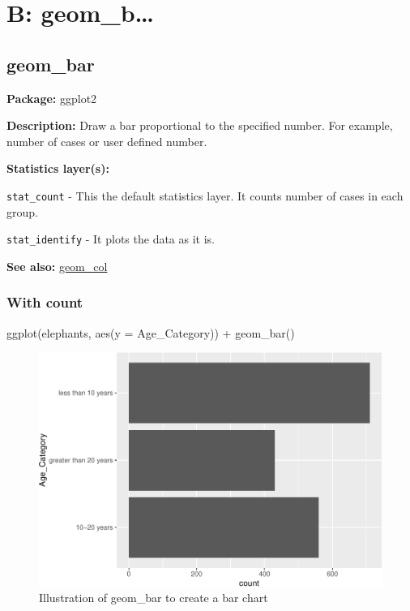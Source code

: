 \documentclass[
]{book}
\newenvironment{Shaded}{\begin{snugshade}}{\end{snugshade}}
\newcommand{\AttributeTok}[1]{\textcolor[rgb]{0.77,0.63,0.00}{#1}}
\newcommand{\FunctionTok}[1]{\textcolor[rgb]{0.00,0.00,0.00}{#1}}
\newcommand{\NormalTok}[1]{#1}
\newcommand{\SpecialCharTok}[1]{\textcolor[rgb]{0.00,0.00,0.00}{#1}}
\begin{document}
\hypertarget{b-geom_b}{%
\chapter{B: geom\_b\ldots{}}\label{b-geom_b}}

\hypertarget{geom_bar}{%
\section{geom\_bar}\label{geom_bar}}

\textbf{Package: } ggplot2 \autocite{R-ggplot2}

\textbf{Description: } Draw a bar proportional to the specified number. For example, number of cases or user defined number.

\textbf{Statistics layer(s): }

\texttt{stat\_count} - This the default statistics layer. It counts number of cases in each group.

\texttt{stat\_identify} - It plots the data as it is.

\textbf{See also: } \protect\hyperlink{col}{geom\_col}

\hypertarget{with-count}{%
\subsection{With count}\label{with-count}}

\begin{Shaded}
\begin{Highlighting}[]
\FunctionTok{ggplot}\NormalTok{(elephants, }\FunctionTok{aes}\NormalTok{(}\AttributeTok{y =}\NormalTok{ Age\_Category)) }\SpecialCharTok{+} 
  \FunctionTok{geom\_bar}\NormalTok{()}
\end{Highlighting}
\end{Shaded}

\begin{figure}
\centering
\includegraphics{Data-Visualisation-geom-Encyclopedia_files/figure-latex/unnamed-chunk-18-1.pdf}
\caption{\label{fig:unnamed-chunk-18}Illustration of geom\_bar to create a bar chart}
\end{figure}
\end{document}
